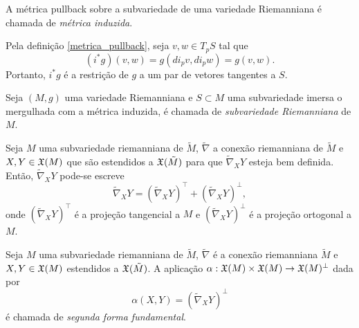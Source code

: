\begin{definicao}\label{metrica_induzida}
	A métrica pullback sobre a subvariedade de uma variedade Riemanniana é chamada de \emph{métrica induzida}.
\end{definicao}

\begin{observacao}
	Pela definição \ref{metrica_pullback}, seja $v,w \in T_p S$ tal que
	\begin{equation*}
	(i^* g)(v,w) = g(di_p v, di_p w) = g(v,w). 
	\end{equation*}
	Portanto, $i^* g$ é a restrição de $g$ a um par de vetores tangentes a $S$. 
\end{observacao}



\begin{definicao}
	Seja $(M,g)$ uma variedade Riemanniana e $S \subset M$ uma subvariedade imersa o mergulhada com a métrica induzida, é chamada de \emph{subvariedade Riemanniana} de $M$.
\end{definicao}

\begin{observacao}
	Seja $M$ uma subvariedade riemanniana de $\tilde{M}$,
	$\tilde{\nabla}$ a conexão riemanniana de $\tilde{M}$ e 
	$X,Y \in \mathfrak{X}(M)$ que são estendidos a $\mathfrak{X}(\tilde{M})$ para que $\tilde{\nabla}_X Y$ esteja bem definida.
	Então, $\tilde{\nabla}_X Y$ pode-se escreve
	\begin{equation*}
	\tilde{\nabla}_X Y = \left(\tilde{\nabla}_X Y\right)^\top + \left(\tilde{\nabla}_X Y\right)^\perp,
	\end{equation*}
	onde $\left(\tilde{\nabla}_X Y\right)^\top$ é a projeção tangencial a $M$ e $\left(\tilde{\nabla}_X Y\right)^\perp$ é a projeção ortogonal a $M$.
\end{observacao}

\begin{definicao}
	Seja $M$ uma subvariedade riemanniana de $\tilde{M}$,
	$\tilde{\nabla}$ é a conexão riemanniana $\tilde{M}$ e
	$X,Y \in \mathfrak{X}(M)$ estendidos a $\mathfrak{X}(\tilde{M})$.
	A aplicação $\alpha: \mathfrak{X}(M) \times \mathfrak{X}(M) \rightarrow \mathfrak{X}(M)^\perp$ dada por
	\begin{equation*}
		\alpha(X,Y) = (\tilde{\nabla}_X Y)^\perp
	\end{equation*} 
	é chamada de \emph{segunda forma fundamental}.
\end{definicao}

